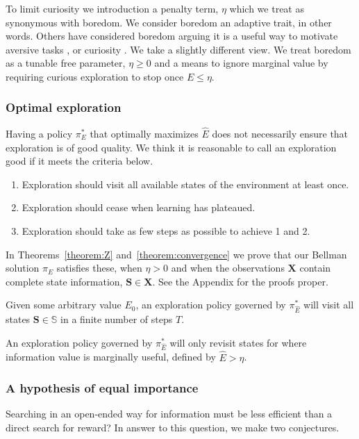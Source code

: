 To limit curiosity we introduction a penalty term, $\eta$ which we treat as synonymous with boredom. We consider boredom an adaptive trait, in other words. Others have considered boredom arguing it is a useful way to motivate aversive tasks \citep{Bench2013}, or curiosity \cite{Loewenstein1994}. We take a slightly different view. We treat boredom as a tunable free parameter, $\eta \ge 0$ and a means to ignore marginal value by requiring curious exploration to stop once $E \le \eta$. 


\subsubsection*{Optimal exploration}
Having a policy $\pi_E^*$ that optimally maximizes $\hat E$ does not necessarily ensure that exploration is of good quality. We think it is reasonable to call an exploration good if it meets the criteria below. 

\begin{enumerate}
	\item Exploration should visit all available states of the environment at least once.
	\item Exploration should cease when learning has plateaued.
	\item Exploration should take as few steps as possible to achieve 1 and 2.
\end{enumerate}

In Theorems~\ref{theorem:Z} and~\ref{theorem:convergence} we prove that our Bellman solution $\pi_E$ satisfies these, when $\eta > 0$ and when the observations $\mathbf{X}$ contain complete state information, $\mathbf{S} \in \mathbf{X}$. See the Appendix for the proofs proper.

\begin{theorem} 
	\label{theorem:Z} 
	Given some arbitrary value $E_0$, an exploration policy governed by $\pi^*_{\hat E}$ will visit all states $\mathbf{S} \in \mathbb{S}$ in a finite number of steps $T$.
\end{theorem}

\begin{theorem} 
	\label{theorem:convergence} 
	An exploration policy governed by $\pi^*_{\hat E}$ will only revisit states for where information value is marginally useful, defined by $\hat E > \eta$.  
\end{theorem}


\subsubsection*{A hypothesis of equal importance}
 Searching in an open-ended way for information must be less efficient than a direct search for reward? In answer to this question, we make two conjectures.

